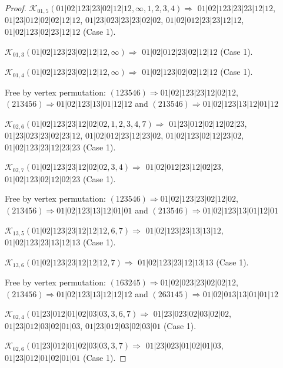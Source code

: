 \documentclass[12pt]{article}
\theoremstyle{plain}
\theoremstyle{definition}
\theoremstyle{remark}
\newcommand{\fancy}[1]{\mathcal{#1}}
\def\K{\fancy{K}}
\begin{document}
\begin{proof}
	\bigskip
	
	$\K_{01,5}(01|02|123|23|02|12|12,\infty,1, 2, 3, 4)\Rightarrow $ $01|02|123|23|23|12|12$, $01|23|012|02|02|12|12$, $01|23|023|23|23|02|02$, $01|02|012|23|23|12|12$, $01|02|123|02|23|12|12$ (Case 1).
	
	$\K_{01,3}(01|02|123|23|02|12|12,\infty)\Rightarrow $ $01|02|012|23|02|12|12$ (Case 1).
	
	$\K_{01,4}(01|02|123|23|02|12|12,\infty)\Rightarrow $ $01|02|123|02|02|12|12$ (Case 1).
	
	
	
	Free by vertex permutation: $(1 2 3 5 4 6)\Rightarrow 01|02|123|23|12|02|12$, $(2 1 3 4 5 6)\Rightarrow 01|02|123|13|01|12|12$ and $(2 1 3 5 4 6)\Rightarrow 01|02|123|13|12|01|12$
	
	
	
	\bigskip
	
	$\K_{02,6}(01|02|123|23|12|02|02,1, 2, 3, 4, 7)\Rightarrow $ $01|23|012|02|12|02|23$, $01|23|023|23|02|23|12$, $01|02|012|23|12|23|02$, $01|02|123|02|12|23|02$, $01|02|123|23|12|23|23$ (Case 1).
	
	$\K_{02,7}(01|02|123|23|12|02|02,3, 4)\Rightarrow $ $01|02|012|23|12|02|23$, $01|02|123|02|12|02|23$ (Case 1).
	
	
	
	Free by vertex permutation: $(1 2 3 5 4 6)\Rightarrow 01|02|123|23|02|12|02$, $(2 1 3 4 5 6)\Rightarrow 01|02|123|13|12|01|01$ and $(2 1 3 5 4 6)\Rightarrow 01|02|123|13|01|12|01$
	
	
	
	\bigskip
	
	$\K_{13,5}(01|02|123|23|12|12|12,6, 7)\Rightarrow $ $01|02|123|23|13|13|12$, $01|02|123|23|13|12|13$ (Case 1).
	
	$\K_{13,6}(01|02|123|23|12|12|12,7)\Rightarrow $ $01|02|123|23|12|13|13$ (Case 1).
	
	
	
	Free by vertex permutation: $(1 6 3 2 4 5)\Rightarrow 01|02|023|23|02|02|12$, $(2 1 3 4 5 6)\Rightarrow 01|02|123|13|12|12|12$ and $(2 6 3 1 4 5)\Rightarrow 01|02|013|13|01|01|12$
	
	
	
	\bigskip
	
	$\K_{02,4}(01|23|012|01|02|03|03,3, 6, 7)\Rightarrow $ $01|23|023|02|03|02|02$, $01|23|012|03|02|01|03$, $01|23|012|03|02|03|01$ (Case 1).
	
	$\K_{02,6}(01|23|012|01|02|03|03,3, 7)\Rightarrow $ $01|23|023|01|02|01|03$, $01|23|012|01|02|01|01$ (Case 1).
	

\end{proof}
\end{document}
